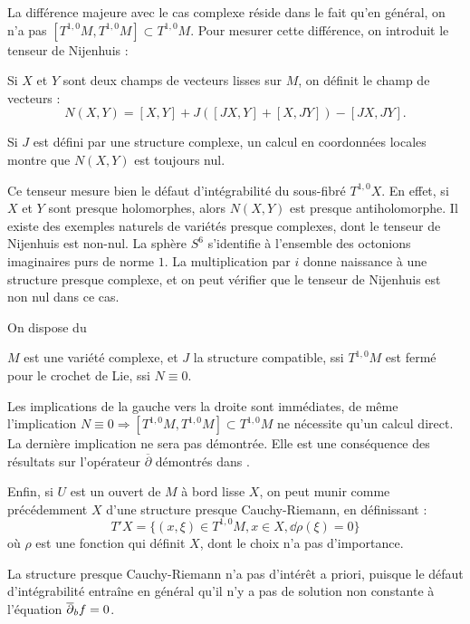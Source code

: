 La différence majeure avec le cas complexe réside dans le fait qu'en général, on n'a pas $[T^{1,0}M, T^{1,0}M]\subset T^{1,0}M$. Pour mesurer cette différence, on introduit le tenseur de Nijenhuis :

\begin{defn}
	Si $X$ et $Y$ sont deux champs de vecteurs lisses sur $M$, on définit le champ de vecteurs :
	\begin{equation*}
		N(X,Y)=[X,Y]+J([JX,Y] + [X,JY]) - [JX,JY].
	\end{equation*}
\end{defn}
Si $J$ est défini par une structure complexe, un calcul en coordonnées locales montre que $N(X,Y)$ est toujours nul.

Ce tenseur mesure bien le défaut d'intégrabilité du sous-fibré
$T^{1,0}X$. En effet, si $X$ et $Y$ sont presque holomorphes, alors
$N(X,Y)$ est presque antiholomorphe. Il existe des exemples naturels
de variétés presque complexes, dont le tenseur de Nijenhuis est
non-nul. La sphère $S^6$ s'identifie à l'ensemble des octonions
imaginaires purs de norme $1$. La multiplication par $i$ donne
naissance à une structure presque complexe, et on peut vérifier que le tenseur de Nijenhuis est non nul dans ce cas. 

On dispose du

\begin{theorem}
	$M$ est une variété complexe, et $J$ la structure compatible, ssi $T^{1,0}M$ est fermé pour le crochet de Lie, ssi $N \equiv 0$.
\end{theorem}
	Les implications de la gauche vers la droite sont immédiates,
        de même l'implication $N \equiv 0 \Rightarrow
        [T^{1,0}M,T^{1,0}M]\subset T^{1,0}M$ ne nécessite qu'un calcul
        direct. La dernière implication ne sera pas démontrée. Elle est une conséquence des résultats sur l'opérateur $\overline{\partial}$ démontrés dans \cite{kohn1963harmonic}.
	
	Enfin, si $U$ est un ouvert de $M$ à bord lisse $X$, on peut munir comme précédemment $X$ d'une structure presque Cauchy-Riemann, en définissant :
	\begin{equation*}
		T'X=\{(x,\xi)\in T^{1,0}M, x\in X, \dd \rho(\xi)=0 \}
	\end{equation*}
	où $\rho$ est une fonction qui définit $X$, dont le choix n'a pas d'importance.
	
	La structure presque Cauchy-Riemann n'a pas d'intérêt a priori, puis\-que le défaut d'intégrabilité entraîne en général qu'il n'y a pas de solution non constante à l'équation $\overline{\partial}_b f =0$.
	
